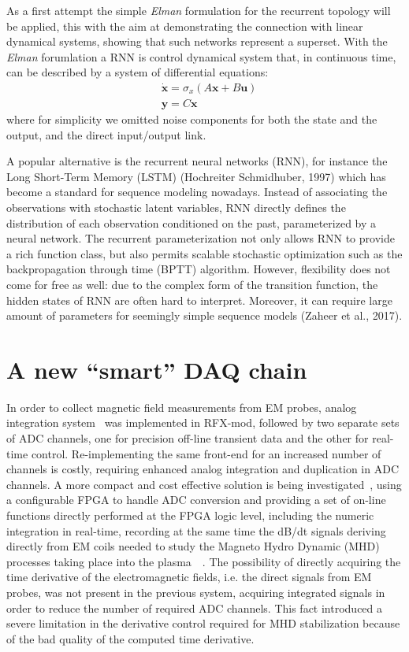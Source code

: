 As a first attempt the simple \textit{Elman} formulation for the recurrent topology will be applied, this with the aim at demonstrating the connection with linear dynamical systems, showing that such networks represent a superset.
With the \textit{Elman} forumlation a \acs{RNN} is control dynamical system that, in continuous time, can be described by a system of differential equations:
\begin{align}
    & \dot{\bm{x}} = \sigma_x \left( A\bm{x} + B\bm{u} \right) \\
    & \bm{y} = C\bm{x}
\end{align}
where for simplicity we omitted noise components for both the state and the output, and the direct input/output link.

A popular alternative is the recurrent neural networks (RNN), for instance the Long Short-Term
Memory (LSTM) (Hochreiter  Schmidhuber, 1997) which has become a standard for sequence
modeling nowadays. Instead of associating the observations with stochastic latent variables, RNN
directly defines the distribution of each observation conditioned on the past, parameterized by a
neural network. The recurrent parameterization not only allows RNN to provide a rich function
class, but also permits scalable stochastic optimization such as the backpropagation through time
(BPTT) algorithm. However, flexibility does not come for free as well: due to the complex form of
the transition function, the hidden states of RNN are often hard to interpret. Moreover, it can require
large amount of parameters for seemingly simple sequence models (Zaheer et al., 2017).




\section{A new “smart” DAQ chain}

In order to collect magnetic field measurements from EM probes, analog integration system~\cite{pomaro2005transducers} was implemented in RFX-mod, followed by two separate sets of ADC channels, one for precision off-line transient data and the other for real-time control. Re-implementing the same front-end for an increased number of channels is costly, requiring enhanced analog integration and duplication in ADC channels.  A more compact and cost effective solution is being investigated~\cite{gottardo18}, using a configurable FPGA to handle ADC conversion and providing a set of on-line functions directly performed at the FPGA logic level, including the numeric integration in real-time, recording at the same time the dB/dt signals deriving directly from EM coils needed to study the Magneto Hydro Dynamic (MHD) processes taking place into the plasma~\cite{zuin2009current}~\cite{innocente2014tearing}. The possibility of directly acquiring the time derivative of the electromagnetic fields, i.e. the direct signals from EM probes, was not present in the previous system, acquiring integrated signals in order to reduce the number of required ADC channels. This fact introduced a severe limitation in the derivative control required for MHD stabilization because of the bad quality of the computed time derivative.


